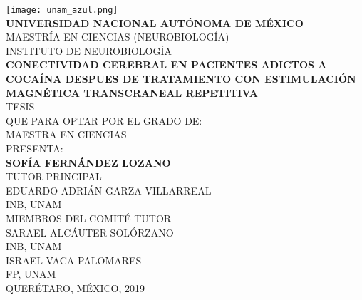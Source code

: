 \begin{titlepage}
    \begin{center}
        \texttt{[image: unam\_azul.png]}\\
        \textbf{UNIVERSIDAD NACIONAL AUTÓNOMA DE MÉXICO}\\
        MAESTRÍA EN CIENCIAS (NEUROBIOLOGÍA)\\
        INSTITUTO DE NEUROBIOLOGÍA\\
        \vspace{10mm}
        \large
        \textbf{CONECTIVIDAD CEREBRAL EN PACIENTES ADICTOS A COCAÍNA DESPUES DE TRATAMIENTO CON ESTIMULACIÓN MAGNÉTICA TRANSCRANEAL REPETITIVA}\\
        \vspace{10mm}
        \large
        TESIS\\
        \normalsize
        QUE PARA OPTAR POR EL GRADO DE:\\
        MAESTRA EN CIENCIAS\\
        \vspace{10mm}
        PRESENTA:\\
        \large
        \textbf{SOFÍA FERNÁNDEZ LOZANO}\\
        \vfill
        \normalsize
        TUTOR PRINCIPAL\\
        EDUARDO ADRIÁN GARZA VILLARREAL\\
        INB, UNAM\\
        \vspace{3mm}
        MIEMBROS DEL COMITÉ TUTOR\\
        SARAEL ALCÁUTER SOLÓRZANO\\
        INB, UNAM\\
        \vspace{1mm}
        ISRAEL VACA PALOMARES\\
        FP, UNAM\\
        \vspace{5mm}
        QUERÉTARO, MÉXICO, 2019
    \end{center}
\end{titlepage}
